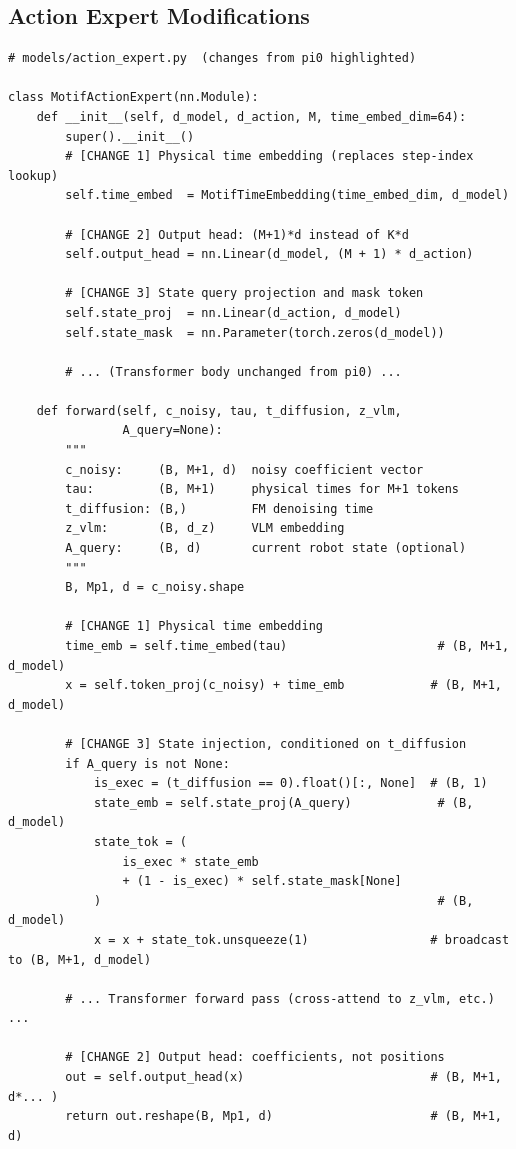 \documentclass[11pt]{article}
\theoremstyle{plain}
\theoremstyle{definition}
\begin{document}
\subsection{Action Expert Modifications}

\begin{verbatim}
# models/action_expert.py  (changes from pi0 highlighted)

class MotifActionExpert(nn.Module):
    def __init__(self, d_model, d_action, M, time_embed_dim=64):
        super().__init__()
        # [CHANGE 1] Physical time embedding (replaces step-index lookup)
        self.time_embed  = MotifTimeEmbedding(time_embed_dim, d_model)

        # [CHANGE 2] Output head: (M+1)*d instead of K*d
        self.output_head = nn.Linear(d_model, (M + 1) * d_action)

        # [CHANGE 3] State query projection and mask token
        self.state_proj  = nn.Linear(d_action, d_model)
        self.state_mask  = nn.Parameter(torch.zeros(d_model))

        # ... (Transformer body unchanged from pi0) ...

    def forward(self, c_noisy, tau, t_diffusion, z_vlm,
                A_query=None):
        """
        c_noisy:     (B, M+1, d)  noisy coefficient vector
        tau:         (B, M+1)     physical times for M+1 tokens
        t_diffusion: (B,)         FM denoising time
        z_vlm:       (B, d_z)     VLM embedding
        A_query:     (B, d)       current robot state (optional)
        """
        B, Mp1, d = c_noisy.shape

        # [CHANGE 1] Physical time embedding
        time_emb = self.time_embed(tau)                     # (B, M+1, d_model)
        x = self.token_proj(c_noisy) + time_emb            # (B, M+1, d_model)

        # [CHANGE 3] State injection, conditioned on t_diffusion
        if A_query is not None:
            is_exec = (t_diffusion == 0).float()[:, None]  # (B, 1)
            state_emb = self.state_proj(A_query)            # (B, d_model)
            state_tok = (
                is_exec * state_emb
                + (1 - is_exec) * self.state_mask[None]
            )                                               # (B, d_model)
            x = x + state_tok.unsqueeze(1)                 # broadcast to (B, M+1, d_model)

        # ... Transformer forward pass (cross-attend to z_vlm, etc.) ...

        # [CHANGE 2] Output head: coefficients, not positions
        out = self.output_head(x)                          # (B, M+1, d*... )
        return out.reshape(B, Mp1, d)                      # (B, M+1, d)
\end{verbatim}
\end{document}
